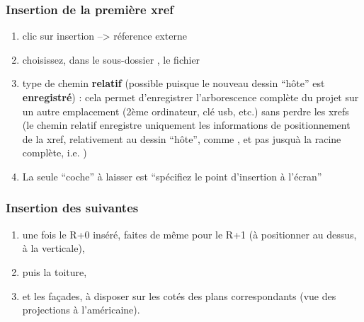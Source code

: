 \documentclass[a4paper,12pt,french]{sphinxmanual}
\begin{document}
\subsubsection{Insertion de la première xref}
\label{init_su+acad/acad1:insertion-de-la-premiere-xref}\begin{enumerate}
\item {} 
clic sur insertion --\textgreater{} réference externe

\item {} 
choisissez, dans le sous-dossier ,  le fichier 

\item {} 
type de chemin \textbf{relatif} (possible puisque le nouveau dessin ``hôte'' est \textbf{enregistré}) : cela permet d'enregistrer l'arborescence complète du projet sur un autre emplacement (2ème ordinateur, clé usb, etc.) sans perdre les xrefs (le chemin relatif enregistre uniquement les informations de positionnement de la xref, relativement au dessin ``hôte'', comme , et pas jusquà la racine complète, i.e.  )

\item {} 
La seule ``coche'' à laisser est ``spécifiez le point d'insertion à l'écran''

\end{enumerate}


\subsubsection{Insertion des suivantes}
\label{init_su+acad/acad1:insertion-des-suivantes}\begin{enumerate}
\item {} 
une fois le R+0 inséré, faites de même pour le R+1 (à positionner au dessus, à la verticale),

\item {} 
puis la toiture,

\item {} 
et les façades, à disposer sur les cotés des plans correspondants (vue des projections à l'américaine).

\end{enumerate}
\end{document}
